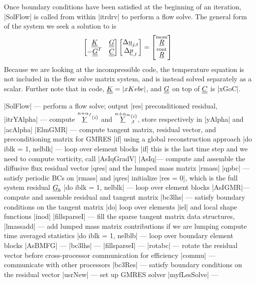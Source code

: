 \documentclass[11pt]{article}
\begin{document}
Once boundary conditions have been satisfied at the beginning of an iteration, |SolFlow| is called from within |itrdrv| to perform a flow solve. The general form of the system we seek a solution to is
\begin{equation}
\begin{bmatrix}
\uul{K}    & \uul{G} \\
-\uul{G}^T & \uul{C}
\end{bmatrix}
\begin{bmatrix}
\Delta \ul{u}_{j,t} \\
\Delta \ul{p}_{,t}
\end{bmatrix}
=
\begin{bmatrix}
\oset{\text{mom}}{\ul{R}} \\
\oset{\text{cont}}{\ul{R}}
\end{bmatrix}
\end{equation}
Because we are looking at the incompressible code, the temperature equation is not included in the flow solve matrix system, and is instead solved separately as a scalar. Further note that in code, $\underline{\underline{K}} = |xKebe|$, and $\underline{\underline{G}}$ on top of $\underline{\underline{C}}$ is |xGoC|.
\begin{outline}[deep]
\1 |SolFlow| --- perform a flow solve; output |res| preconditioned residual, 
	\2 |itrYAlpha| --- compute $\oset{n+\alpha_f}{\ul{Y}}^{(i)}$ and $\oset{n+\alpha_m}{\ul{Y}}^{(i)}_{,t}$, store respectively in |yAlpha| and |acAlpha|
	\2 |ElmGMR| --- compute tangent matrix, residual vector, and preconditioning matrix for GMRES
		\3 |if| using a global reconstruction approach
			\4 |do iblk = 1, nelblk| --- loop over element blocks
				\5 |if| this is the last time step and we need to compute vorticity, call |AsIqGradV|
				\5 |AsIq|\ra --- compute and assemble the diffusive flux residual vector |qres| and the lumped mass matrix |rmass|
			\4 |qpbc| --- satisfy periodic BCs on |rmass| and |qres|
		\3 initialize |res = 0|, which is the full system residual $\underline{G}_b$
		\3 |do iblk = 1, nelblk| --- loop over element blocks
			\4 |AsIGMR|\ra --- compute and assemble residual and tangent matrix
			\4 |bc3lhs| --- satisfy boundary conditions on the tangent matrix
				\5 |do| loop over elements |iel| and local shape functions |inod|
					\6 
			\4 |fillsparseI| --- fill the sparse tangent matrix data structures, 
		\3 |lmassadd| --- add lumped mass matrix contributions if we are lumping
		\3 compute time averaged statistics
		\3 |do iblk = 1, nelblb| --- loop over boundary element blocks
			\4 |AsBMFG| ---
			\4 |bc3lhs| --- 
			\4 |fillsparseI| ---
		\3 |rotabc| --- rotate the residual vector before cross-processor communication for efficiency
		\3 |commu| --- communicate with other processors
		\3 |bc3Res| --- satisfy boundary conditions on the residual vector
	\2 |usrNew| --- set up GMRES solver
	\2 |myfLesSolve| --- 
\end{outline}
\end{document}
